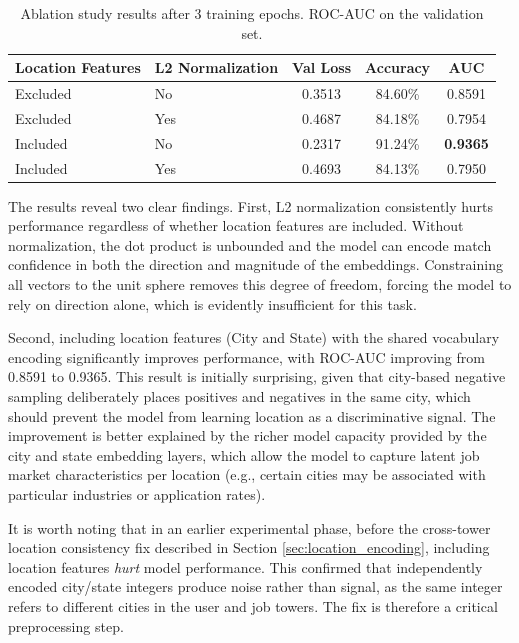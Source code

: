 \begin{table}[htbp]
    \centering
    \caption{Ablation study results after 3 training epochs. \gls{ROC-AUC} on the validation set.}
    \label{tab:ablation}
    \begin{tabular}{|l|l|c|c|c|}
        \hline
        \textbf{Location Features} & \textbf{L2 Normalization} & \textbf{Val Loss} & \textbf{Accuracy} & \textbf{AUC} \\
        \hline
        Excluded & No  & 0.3513 & 84.60\% & 0.8591 \\
        Excluded & Yes & 0.4687 & 84.18\% & 0.7954 \\
        Included & No  & 0.2317 & 91.24\% & \textbf{0.9365} \\
        Included & Yes & 0.4693 & 84.13\% & 0.7950 \\
        \hline
    \end{tabular}
\end{table}

The results reveal two clear findings. First, L2 normalization consistently hurts performance regardless of whether location features are included. Without normalization, the dot product is unbounded and the model can encode match confidence in both the direction and magnitude of the embeddings. Constraining all vectors to the unit sphere removes this degree of freedom, forcing the model to rely on direction alone, which is evidently insufficient for this task.

Second, including location features (City and State) with the shared vocabulary encoding significantly improves performance, with \gls{ROC-AUC} improving from 0.8591 to 0.9365. This result is initially surprising, given that city-based negative sampling deliberately places positives and negatives in the same city, which should prevent the model from learning location as a discriminative signal. The improvement is better explained by the richer model capacity provided by the city and state embedding layers, which allow the model to capture latent job market characteristics per location (e.g., certain cities may be associated with particular industries or application rates).

It is worth noting that in an earlier experimental phase, before the cross-tower location consistency fix described in Section \ref{sec:location_encoding}, including location features \textit{hurt} model performance. This confirmed that independently encoded city/state integers produce noise rather than signal, as the same integer refers to different cities in the user and job towers. The fix is therefore a critical preprocessing step.

